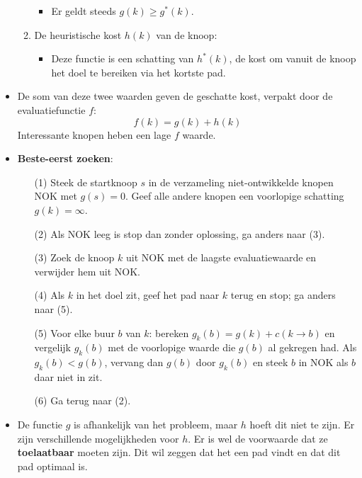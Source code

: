 \begin{itemize}
\begin{enumerate}
\begin{itemize}
			\item Er geldt steeds $g(k) \geq g^*(k)$.
		\end{itemize} 
		\item De heuristische kost $h(k)$ van de knoop:
		\begin{itemize}
			\item Deze functie is een schatting van $h^*(k)$, de kost om vanuit de knoop het doel te bereiken via het kortste pad.
		\end{itemize}
	\end{enumerate}
	\item De som van deze twee waarden geven de geschatte kost, verpakt door de evaluatiefunctie $f$:
	$$f(k) = g(k) + h(k)$$
	\alert Interessante knopen heben een lage $f$ waarde. 
	\item \textbf{Beste-eerst zoeken}:
	\begin{enumerate}
		\item[(1)] Steek de startknoop $s$ in de verzameling niet-ontwikkelde knopen NOK met $g(s) = 0$. Geef alle andere knopen een voorlopige schatting $g(k) = \infty$.
		\item[(2)] Als NOK leeg is stop dan zonder oplossing, ga anders naar (3).
		\item[(3)] Zoek de knoop $k$ uit NOK met de laagste evaluatiewaarde en verwijder hem uit NOK.
		\item[(4)] Als $k$ in het doel zit, geef het pad naar $k$ terug en stop; ga anders naar (5).
		\item[(5)] Voor elke buur $b$ van $k$: bereken $g_k(b) = g(k) + c(k \rightarrow b)$ en vergelijk $g_k(b)$ met de voorlopige waarde die $g(b)$ al gekregen had. Als $g_k(b) < g(b)$, vervang dan $g(b)$ door $g_k(b)$ en steek $b$ in NOK als $b$ daar niet in zit.
		\item[(6)] Ga terug naar (2).
	\end{enumerate}
	\item De functie $g$ is afhankelijk van het probleem, maar $h$ hoeft dit niet te zijn. Er zijn verschillende mogelijkheden voor $h$. Er is wel de voorwaarde dat ze \textbf{toelaatbaar} moeten zijn. Dit wil zeggen dat het een pad vindt en dat dit pad optimaal is.
\end{itemize}
